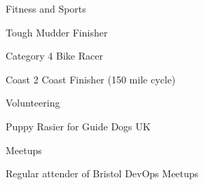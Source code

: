 

\begin{cventries}

  \cventry
    {Fitness and Sports} %
    {} %
    {} %
    {} %
    {
      \begin{cvitems} %
        \item {Tough Mudder Finisher}
        \item {Category 4 Bike Racer}
        \item {Coast 2 Coast Finisher (150 mile cycle)}
      \end{cvitems}
    }

    \cventry
    {Volunteering} %
    {} %
    {} %
    {} %
    {
      \begin{cvitems} %
        \item {Puppy Rasier for Guide Dogs UK}
      \end{cvitems}
    }

  \cventry
    {Meetups} %
    {} %
    {} %
    {} %
    {
      \begin{cvitems} %
        \item {Regular attender of Bristol DevOps Meetups}
      \end{cvitems}
    }

\end{cventries}
